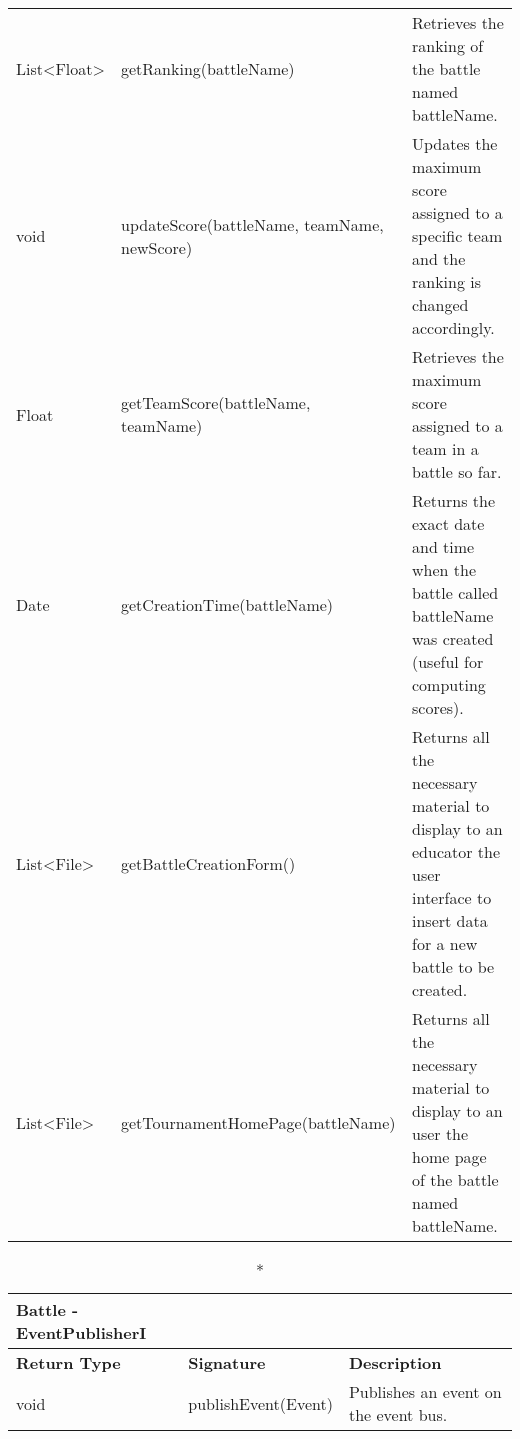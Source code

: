 \begin{longtable}{|p{2.5cm} p{6.5cm} p{4.5cm}|}
	List\textless Float\textgreater & getRanking(battleName) & Retrieves the ranking of the battle named battleName.\\
	
	void & updateScore(battleName, teamName, newScore) & Updates the maximum score assigned to a specific team and the ranking is changed accordingly.\\
	
	Float & getTeamScore(battleName, teamName) & Retrieves the maximum score assigned to a team in a battle so far.\\
	
	Date & getCreationTime(battleName) & Returns the exact date and time when the battle called battleName was created (useful for computing scores).\\
	
	List\textless File\textgreater & getBattleCreationForm() & Returns all the necessary material to display to an educator the user interface to insert data for a new battle to be created.\\
	
	List\textless File\textgreater & getTournamentHomePage(battleName) & Returns all the necessary material to display to an user the home page of the battle named battleName.\\
	
	\hline
	
\end{longtable}




\begin{longtable}{|p{2.5cm} p{6.5cm} p{4.5cm}|}
\caption*{Battle - EventPublisherI}\\ 

\hline
\textbf{Return Type} & \textbf{Signature} & \textbf{Description}\\
\hline \endhead

void & publishEvent(Event)  & Publishes an event on the event bus.\\

\hline

\end{longtable}

\pagebreak


